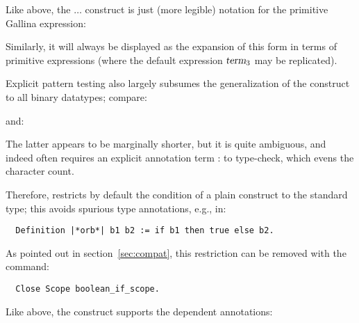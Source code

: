 Like  above, the $\dots$ construct is just (more legible)
notation for the primitive Gallina expression:

\begin{center}
    \ssrC{=>}  \ssrC{| _ =>}  
\end{center}

Similarly, it will always be displayed as the expansion of this form
in terms of primitive  expressions (where the default
expression $\ssrN[3]{term}$ may be replicated).


Explicit pattern testing also largely subsumes the generalization of
the  construct to all binary datatypes; compare:

\begin{center}
 {\term}    
\end{center}

and:

\begin{center}
 {\term}    
\end{center}

The latter appears to be marginally shorter, but it is quite
ambiguous, and indeed often
requires an explicit annotation term : \ssrC{\{_\}+\{_\}} to type-check,
which evens the character count.

Therefore, \ssr{} restricts by default the condition of a plain 
construct to the standard  type; this avoids spurious type
annotations, e.g., in:
\begin{lstlisting}
  Definition |*orb*| b1 b2 := if b1 then true else b2.
\end{lstlisting}
As pointed out in section~\ref{sec:compat}, this restriction can be removed with
the command:
\begin{lstlisting}
  Close Scope boolean_if_scope.
\end{lstlisting}
Like  above, the  {\term}  
 {\term} construct
supports the dependent  annotations:

\begin{center}
             
\end{center}

